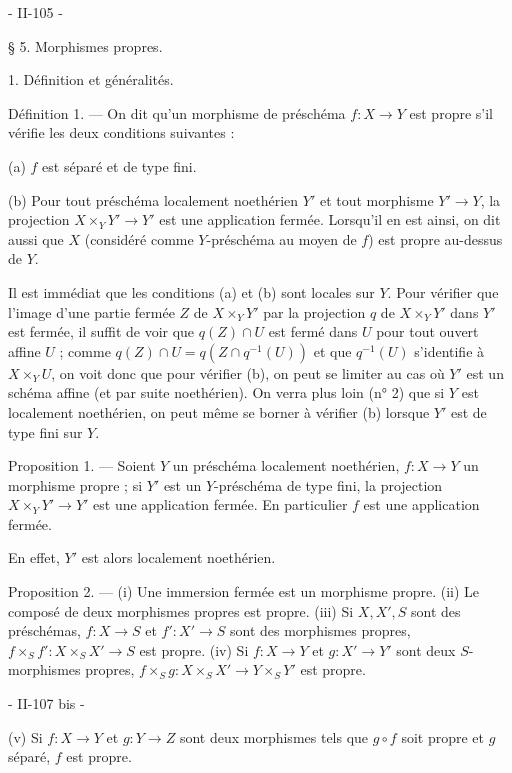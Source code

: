 

- II-105 -

§ 5. Morphismes propres.

1. Définition et généralités.

Définition 1. — On dit qu'un morphisme de préschéma $f : X \to Y$ est propre s'il vérifie les deux conditions suivantes :

(a) $f$ est séparé et de type fini.

(b) Pour tout préschéma localement noethérien $Y'$ et tout morphisme $Y' \to Y$, la projection $X \times_Y Y' \to Y'$ est une application fermée. Lorsqu'il en est ainsi, on dit aussi que $X$ (considéré comme $Y$-préschéma au moyen de $f$) est propre au-dessus de $Y$.

Il est immédiat que les conditions (a) et (b) sont locales sur $Y$. Pour vérifier que l'image d'une partie fermée $Z$ de $X \times_Y Y'$ par la projection $q$ de $X \times_Y Y'$ dans $Y'$ est fermée, il suffit de voir que $q(Z) \cap U$ est fermé dans $U$ pour tout ouvert affine $U$ ; comme $q(Z) \cap U = q(Z \cap q^{-1}(U))$ et que $q^{-1}(U)$ s'identifie à $X \times_Y U$, on voit donc que pour vérifier (b), on peut se limiter au cas où $Y'$ est un schéma affine (et par suite noethérien). On verra plus loin (n° 2) que si $Y$ est localement noethérien, on peut même se borner à vérifier (b) lorsque $Y'$ est de type fini sur $Y$.

Proposition 1. — Soient $Y$ un préschéma localement noethérien, $f : X \to Y$ un morphisme propre ; si $Y'$ est un $Y$-préschéma de type fini, la projection $X \times_Y Y' \to Y'$ est une application fermée. En particulier $f$ est une application fermée.

En effet, $Y'$ est alors localement noethérien.

Proposition 2. — (i) Une immersion fermée est un morphisme propre.
(ii) Le composé de deux morphismes propres est propre.
(iii) Si $X, X', S$ sont des préschémas, $f : X \to S$ et $f' : X' \to S$ sont des morphismes propres, $f \times_S f' : X \times_S X' \to S$ est propre.
(iv) Si $f : X \to Y$ et $g : X' \to Y'$ sont deux $S$-morphismes propres, $f \times_S g : X \times_S X' \to Y \times_S Y'$ est propre.

\newpage


- II-107 bis -

(v) Si $f : X \to Y$ et $g : Y \to Z$ sont deux morphismes tels que $g \circ f$ soit propre et $g$ séparé, $f$ est propre.

